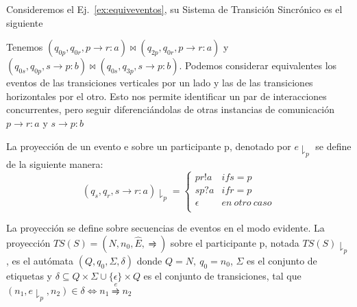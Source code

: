 \begin{example} 
\label{ex:STS}
Consideremos el Ej.~\ref{ex:equiveventos}, su Sistema de Transición Sincrónico es el siguiente


Tenemos $(q_{0p}, q_{0r}, p \rightarrow r:a) \bowtie (q_{2p}, q_{0r}, p \rightarrow r:a)$ y $(q_{0s}, q_{0p}, s \rightarrow p:b) \bowtie (q_{0s}, q_{3p}, s \rightarrow p:b)$. Podemos considerar equivalentes los eventos de las transiciones verticales por un lado y las de las transiciones horizontales por el otro. Esto nos permite identificar un par de interacciones concurrentes, pero seguir diferenciándolas de otras instancias de comunicación $p \rightarrow r:a$ y $s \rightarrow p:b$
\end{example}

\begin{definition}[Proyecciones] La proyección de un evento e sobre un participante p, denotado por $e \downharpoonright_p$ se define de la siguiente manera:
\begin{equation}
(q_s,q_r,s \rightarrow r:a) \downharpoonright_p = \begin{cases} 
pr!a & \mathit{if} s=p \\
sp?a & \mathit{if} r=p \\
\epsilon & \mathit{en \ otro \ caso} \\
\end{cases} 
\end{equation}

La proyección se define sobre secuencias de eventos en el modo evidente. La proyección $TS(S)= (N, n_0, \hat{E}, \rightrightharpoons)$ sobre el participante p, notada $ TS(S) \downharpoonright_p $, es el autómata $(Q, q_0, \Sigma, \delta)$ donde $Q=N, \ q_0 = n_0$, $\Sigma$ es el conjunto de etiquetas y $\delta \subseteq Q \times \Sigma \cup \{ \epsilon \} \times Q $ es el conjunto de transiciones, tal que $(n_1, e \downharpoonright_p, n_2) \in \delta \iff n_1 \overset{e}{\rightrightharpoons} n_2 $
\end{definition}

